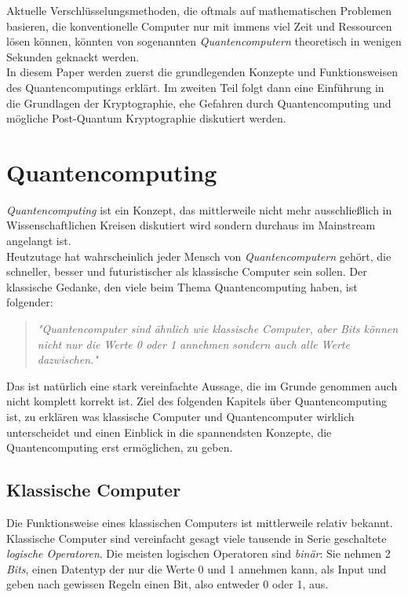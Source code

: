 \documentclass[12pt]{article}
\begin{document}
 Aktuelle Verschlüsselungsmethoden, die oftmals auf mathematischen Problemen basieren, die konventionelle Computer nur mit immens viel Zeit und Ressourcen lösen können, könnten von sogenannten \textit{Quantencomputern} theoretisch in wenigen Sekunden geknackt werden. \\

In diesem Paper werden zuerst die grundlegenden Konzepte und Funktionsweisen des Quantencomputings erklärt. Im zweiten Teil folgt dann eine Einführung in die Grundlagen der Kryptographie, ehe Gefahren durch Quantencomputing und mögliche Post-Quantum Kryptographie diskutiert werden.

\clearpage
\section{Quantencomputing}

\textit{Quantencomputing} ist ein Konzept, das mittlerweile nicht mehr ausschließlich in Wissenschaftlichen Kreisen diskutiert wird sondern durchaus im Mainstream angelangt ist.\\
Heutzutage hat wahrscheinlich jeder Mensch von \textit{Quantencomputern} gehört, die schneller, besser und futuristischer als klassische Computer sein sollen. Der klassische Gedanke, den viele beim Thema Quantencomputing haben, ist folgender:

\begin{quote}
    \textit{"Quantencomputer sind ähnlich wie klassische Computer, aber Bits können nicht nur die Werte 0 oder 1 annehmen sondern auch alle Werte dazwischen."}
\end{quote}

Das ist natürlich eine stark vereinfachte Aussage, die im Grunde genommen auch nicht komplett korrekt ist. Ziel des folgenden Kapitels über Quantencomputing ist, zu erklären was klassische Computer und Quantencomputer wirklich unterscheidet und einen Einblick in die spannendsten Konzepte, die Quantencomputing erst ermöglichen, zu geben.

\subsection{Klassische Computer}

Die Funktionsweise eines klassischen Computers ist mittlerweile relativ bekannt. Klassische Computer sind vereinfacht gesagt viele tausende in Serie geschaltete \textit{logische Operatoren}. Die meisten logischen Operatoren sind \textit{binär}: Sie nehmen 2 \textit{Bits}, einen Datentyp der nur die Werte 0 und 1 annehmen kann, als Input und geben nach gewissen Regeln einen Bit, also entweder 0 oder 1, aus. \cite{quantum1998} \\
\end{document}
